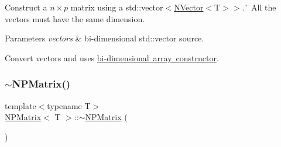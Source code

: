 Construct a $ n \times p $ matrix using a {\ttfamily std\+::vector$<$\mbox{\hyperlink{class_n_vector}{N\+Vector}}$<$T$>$$>$}.\`{} All the vectors must have the same dimension. 


\begin{DoxyParams}{Parameters}
{\em vectors} & bi-\/dimensional {\ttfamily std\+::vector} source.\\
\hline
\end{DoxyParams}
Convert {\ttfamily vectors} and uses \mbox{\hyperlink{class_n_p_matrix_ad5fc4003cdc740be5eed12134929101c}{bi-\/dimensional array constructor}}. \mbox{\label{class_n_p_matrix_a8679cd5ef65eea15ae5128b0e69fdd6e}} 
\subsubsection{\texorpdfstring{$\sim$NPMatrix()}{~NPMatrix()}}
{\footnotesize\ttfamily template$<$typename T$>$ \\
\mbox{\hyperlink{class_n_p_matrix}{N\+P\+Matrix}}$<$ T $>$\+::$\sim$\mbox{\hyperlink{class_n_p_matrix}{N\+P\+Matrix}} (\begin{DoxyParamCaption}{ }\end{DoxyParamCaption})\hspace{0.3cm}{\ttfamily [inline]}}

\mbox{\label{class_n_p_matrix_ab8c664f1aa435b8b1bb5e1fdd293423f}} 
